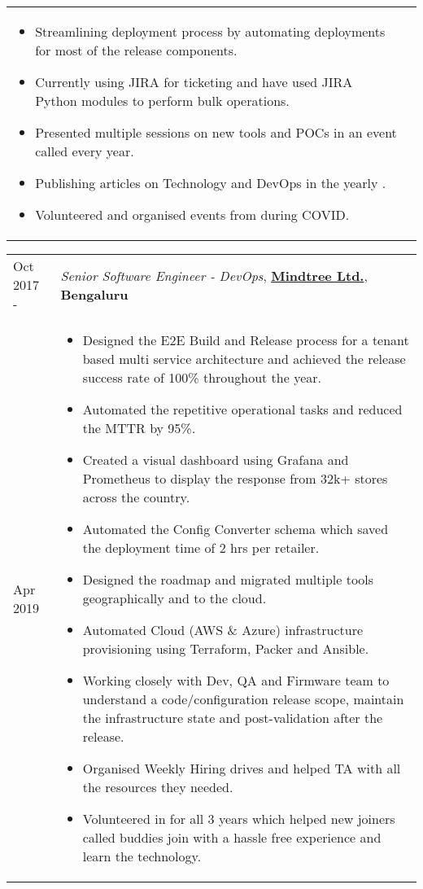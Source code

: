 \documentclass[11pt, a4paper]{article}
\begin{document}
\begin{tabular}{L{1.7cm}!{\color{gray}\vrule}l}
\begin{minipage}[t]{0.86\textwidth}
\begin{itemize}[leftmargin=*]
     \item Streamlining deployment process by automating deployments for most of the release components.
     \item Currently using JIRA for ticketing and have used JIRA Python modules to perform bulk operations.
    \item Presented multiple sessions on new tools and POCs in an event called  every year.
    \item Publishing articles on Technology and DevOps in the yearly .
    \item Volunteered and organised  events from  during COVID.
    \end{itemize}
  \end{minipage}
\end{tabular} 

\vspace{4mm}

\noindent\begin{tabular}{L{1.7cm}!{\color{gray}\vrule}l}
Oct 2017 -  & \textit{Senior Software Engineer - DevOps}, \textcolor{NavyBlue}{\textbf{\href{https://www.mindtree.com}{Mindtree Ltd.}}},  \textbf{Bengaluru} \\
Apr 2019 &
  \begin{minipage}[t]{0.86\textwidth}
    \begin{itemize}[leftmargin=*]
    \itemsep-0.5em 
    \item Designed the E2E Build and Release process for a tenant based multi service architecture and achieved the release success rate of 100\% throughout the year.
    \item Automated the repetitive operational tasks and reduced the MTTR by 95\%.
    \item Created a visual dashboard using Grafana and Prometheus to display the response from 32k+ stores across the country.
    \item Automated the Config Converter schema which saved the deployment time of 2 hrs per retailer.
    \item Designed the roadmap and migrated multiple tools geographically and to the cloud.
    \item Automated Cloud (AWS \& Azure) infrastructure provisioning using Terraform, Packer and Ansible.
    \item Working closely with Dev, QA and Firmware team to understand a code/configuration release scope,
maintain the infrastructure state and post-validation after the release.
    \item Organised Weekly Hiring drives and helped TA with all the resources they needed.
    \item Volunteered in  for all 3 years which helped new joiners called buddies join with a hassle free experience and learn the technology.
    \end{itemize}
  \end{minipage}
\end{tabular} 
\end{document}
